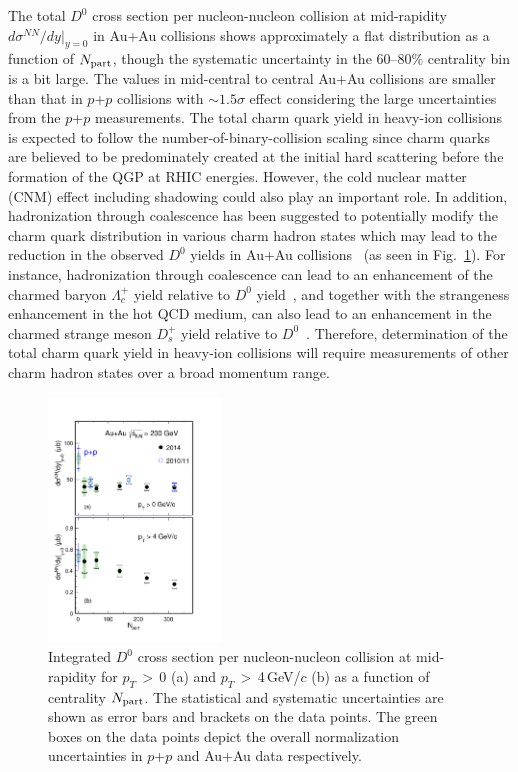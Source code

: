 \documentclass[%
 reprint,	
 amsmath,amssymb,
 aps,
 prc,
]{revtex4-1}
\begin{document}
The total $D^0$ cross section per nucleon-nucleon collision at mid-rapidity $d\sigma^{NN}/dy|_{y=0}$ in Au+Au collisions shows approximately a flat distribution as a function of $N_{\rm part}$, though the systematic uncertainty in the 60--80\% centrality bin is a bit large. The values in mid-central to central Au+Au collisions are smaller than that in $p$+$p$ collisions with $\sim1.5\sigma$ effect considering the large uncertainties from the $p$+$p$ measurements. The total charm quark yield in heavy-ion collisions is expected to follow the number-of-binary-collision scaling since charm quarks are believed to be predominately created at the initial hard scattering before the formation of the QGP at RHIC energies. However, the cold nuclear matter (CNM) effect including shadowing could also play an important role. In addition, hadronization through coalescence has been suggested to potentially modify the charm quark distribution in various charm hadron states which may lead to the reduction in the observed $D^0$ yields in Au+Au collisions~\cite{GRECO2004202} (as seen in Fig.~\ref{fig:Xsection_D0}). For instance, hadronization through coalescence can lead to an enhancement of the charmed baryon $\Lambda_{c}^+$ yield relative to $D^0$ yield~\cite{Oh2009}, and together with the strangeness enhancement in the hot QCD medium, can also lead to an enhancement in the charmed strange meson $D_{s}^+$ yield relative to $D^0$~\cite{He2013}. Therefore, determination of the total charm quark yield in heavy-ion collisions will require measurements of other charm hadron states over a broad momentum range.

\begin{figure}
\centering
\includegraphics[width=0.41\textwidth]{fig/Xsection_D0.pdf}
  \caption{Integrated $D^{0}$ cross section per nucleon-nucleon collision at mid-rapidity for $p_{T}$\,$>$\,0 (a) and $p_{T}$\,$>$\,4\,GeV/$c$ (b) as a function of centrality $N_{\rm part}$. The statistical and systematic uncertainties are shown as error bars and brackets on the data points. The green boxes on the data points depict the overall normalization uncertainties in $p$+$p$ and Au+Au data respectively.}
\label{fig:Xsection_D0} 
\end{figure}
\end{document}
